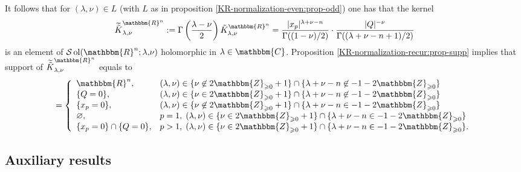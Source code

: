 \documentclass{article}
\newcommand{\assign}{:=}
\newcommand{\comma}{{,}}
\newcommand{\nin}{\not\in}
\newcommand{\tmop}[1]{\ensuremath{\operatorname{#1}}}
\newcommand{\upl}{+}
\numberwithin{definition}{section}
\numberwithin{lemma}{section}
\numberwithin{proposition}{section}
{\theorembodyfont{\rmfamily}\newtheorem{remark}{Remark}
\numberwithin{remark}{section}
}
\begin{document}
\begin{remark}
  \label{KR-normalization-even:rmk-Atilde}It follows that for $( \lambda, \nu)
  \in L$ (with $L$ as in proposition \ref{KR-normalization-even:prop-odd}) one
  has that the kernel
  \[ \widetilde{\tilde{K}}^{\mathbbm{R}^n}_{\lambda, \nu} \assign \Gamma
     \left( \frac{\lambda - \nu}{2} \right) \tilde{K}_{\lambda,
     \nu}^{\mathbbm{R}^n} = \frac{| x_p |^{\lambda + \nu - n}}{\Gamma ( ( 1 -
     \nu) / 2)} \cdot \frac{| Q |^{- \nu}}{\Gamma ( ( \lambda + \nu - n \upl
     1) / 2)} \]
  is an element of $\mathcal{S} \tmop{ol} ( \mathbbm{R}^n ; \lambda \comma
  \nu)$ holomorphic in $\lambda \in \mathbbm{C}$. Proposition
  \ref{KR-normalization-recur:prop-supp} implies that support of
  $\widetilde{\tilde{K}}_{\lambda, \nu}^{\mathbbm{R}^n}$ equals to
  \[ = \left\{ \begin{array}{ll}
       \mathbbm{R}^n, & ( \lambda, \nu) \in \{ \nu \nin
       2\mathbbm{Z}_{\geqslant 0} + 1 \} \cap \{ \lambda + \nu - n \nin - 1 -
       2\mathbbm{Z}_{\geqslant 0} \}\\
       \{ Q = 0 \}, & ( \lambda, \nu) \in \{ \nu \in 2\mathbbm{Z}_{\geqslant
       0} + 1 \} \cap \{ \lambda + \nu - n \nin - 1 - 2\mathbbm{Z}_{\geqslant
       0} \}\\
       \{ x_p = 0 \}, & ( \lambda, \nu) \in \{ \nu \nin
       2\mathbbm{Z}_{\geqslant 0} + 1 \} \cap \{ \lambda + \nu - n \in - 1 -
       2\mathbbm{Z}_{\geqslant 0} \}\\
       \varnothing, & p = 1, \; ( \lambda, \nu) \in \{ \nu \in
       2\mathbbm{Z}_{\geqslant 0} + 1 \} \cap \{ \lambda + \nu - n \in - 1 -
       2\mathbbm{Z}_{\geqslant 0} \}\\
       \{ x_p = 0 \} \cap \{ Q = 0 \}, & p > 1, \; ( \lambda, \nu) \in \{ \nu
       \in 2\mathbbm{Z}_{\geqslant 0} + 1 \} \cap \{ \lambda + \nu - n \in - 1
       - 2\mathbbm{Z}_{\geqslant 0} \} .
     \end{array} \right. \]
\end{remark}

\subsection{Auxiliary results}
\end{document}
